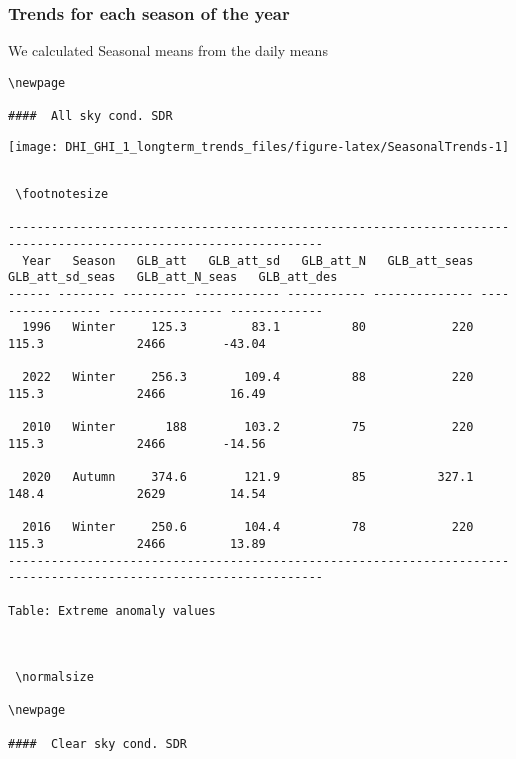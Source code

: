 \documentclass[
  10pt,
  a4paper,oneside]{article}
\begin{document}
\newpage
\FloatBarrier

\hypertarget{trends-for-each-season-of-the-year}{%
\subsubsection{Trends for each season of the year}\label{trends-for-each-season-of-the-year}}

We calculated Seasonal means from the daily means

\begin{verbatim}
\newpage

####  All sky cond. SDR 
\end{verbatim}

\begin{center}\texttt{[image: DHI\_GHI\_1\_longterm\_trends\_files/figure-latex/SeasonalTrends-1]} \end{center}

\begin{verbatim}
 
 \footnotesize 
 
------------------------------------------------------------------------------------------------------------------
  Year   Season   GLB_att   GLB_att_sd   GLB_att_N   GLB_att_seas   GLB_att_sd_seas   GLB_att_N_seas   GLB_att_des
------ -------- --------- ------------ ----------- -------------- ----------------- ---------------- -------------
  1996   Winter     125.3         83.1          80            220             115.3             2466        -43.04

  2022   Winter     256.3        109.4          88            220             115.3             2466         16.49

  2010   Winter       188        103.2          75            220             115.3             2466        -14.56

  2020   Autumn     374.6        121.9          85          327.1             148.4             2629         14.54

  2016   Winter     250.6        104.4          78            220             115.3             2466         13.89
------------------------------------------------------------------------------------------------------------------

Table: Extreme anomaly values


 
 \normalsize 
 
\newpage

####  Clear sky cond. SDR 
\end{verbatim}
\end{document}
